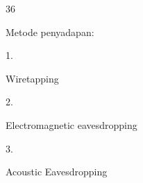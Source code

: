 \documentclass{article}
\begin{document}

36

Metode penyadapan:

1.

Wiretapping

2.

Electromagnetic eavesdropping

3.

Acoustic Eavesdropping
\end{document}
